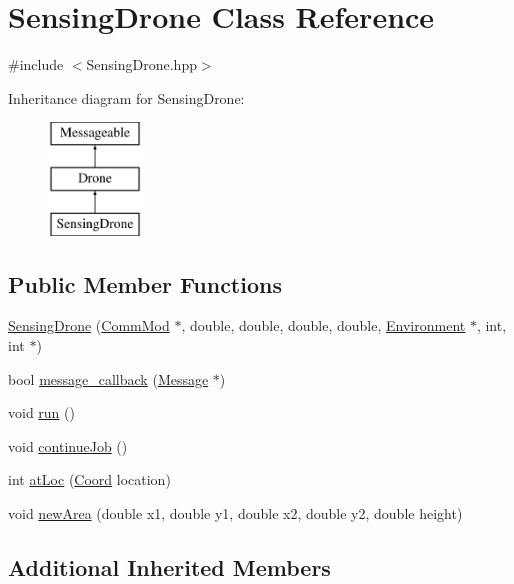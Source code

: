 \hypertarget{class_sensing_drone}{}\section{Sensing\+Drone Class Reference}
\label{class_sensing_drone}


{\ttfamily \#include $<$Sensing\+Drone.\+hpp$>$}

Inheritance diagram for Sensing\+Drone\+:\begin{figure}[H]
\begin{center}
\leavevmode
\includegraphics[height=3.000000cm]{class_sensing_drone}
\end{center}
\end{figure}
\subsection*{Public Member Functions}
\begin{DoxyCompactItemize}
\item 
\hyperlink{class_sensing_drone_ad79d34153985242e38f68dbe46754ed7}{Sensing\+Drone} (\hyperlink{class_comm_mod}{Comm\+Mod} $\ast$, double, double, double, double, \hyperlink{class_environment}{Environment} $\ast$, int, int $\ast$)
\item 
bool \hyperlink{class_sensing_drone_a2f4e2de60a0d37c6d6a39078df3458ba}{message\+\_\+callback} (\hyperlink{class_message}{Message} $\ast$)
\item 
void \hyperlink{class_sensing_drone_a84dd9d47273b8c4c05853b15547be6a2}{run} ()
\item 
void \hyperlink{class_sensing_drone_a357bfe8d14cba7c52f8817ebf3350102}{continue\+Job} ()
\item 
int \hyperlink{class_sensing_drone_ae1d4713f47df84336a51c78b171a0d68}{at\+Loc} (\hyperlink{struct_coord}{Coord} location)
\item 
void \hyperlink{class_sensing_drone_ad46ca36b37a3e8139f6ad7f1c2f4bcfe}{new\+Area} (double x1, double y1, double x2, double y2, double height)
\end{DoxyCompactItemize}
\subsection*{Additional Inherited Members}


